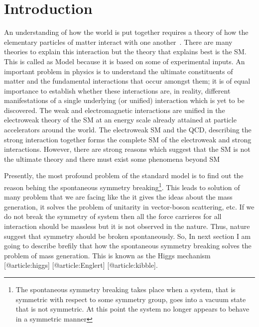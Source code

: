 \chapter{Introduction}
An understanding of how the world is put together requires a theory of how the elementary particles of matter interact with one another~\cite{Hooft1980}. There are many theories to explain this interaction but the theory that explains best is the SM. This is called as Model because it is based on some of experimental inputs. An important problem in physics is to understand the ultimate constituents of matter and the fundamental interactions that occur amongst them; it is of equal importance to establish whether these interactions are, in reality, different manifestations of a single underlying (or unified) interaction which is yet to be discovered. The weak and electromagnetic interactions are unified in the electroweak theory of the SM at an energy scale already attained at particle accelerators around the world. The electroweak SM and the QCD, describing the strong interaction together forms the complete SM of the electroweak and strong interactions. However, there are strong reasons which suggest that the SM is not the ultimate theory and there must exist some phenomena beyond SM \cite{Quigg1985,article:PAdventure}


Presently, the most profound problem of the standard model is to find out the reason behing the spontaneous symmetry breaking\footnote{The spontaneous symmetry breaking takes place when a system, that is symmetric with respect to some symmetry group, goes into a vacuum state that is not symmetric. At this point the system no longer appears to behave in a symmetric manner}. This leads to solution of many problem that we are facing like the it gives the ideas about the mass generation, it solves the problem of unitarity in vector-boson scattering, etc. If we do not break the symmetry of system then all the force carrieres for all interaction should be massless but it is not observed in the nature. Thus, nature suggest that symmetry should be broken spontaneously. So, In next section I am going to describe brefily that how the spontaneous symmetry breaking solves the problem of mass generation. This is known as the Higgs mechanism [@article:higgs] [@article:Englert] [@article:kibble].







